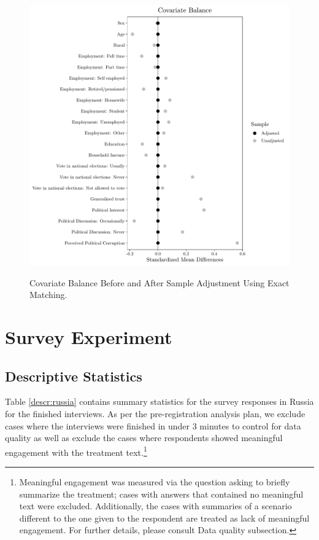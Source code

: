 \documentclass[11pt, ngerman,english,a4]{article}
\begin{document}
\begin{figure}[H]
    \caption{Covariate Balance Before and After Sample Adjustment Using Exact Matching.}
    \centering
    \includegraphics[width=0.9\linewidth]{covbalance_exact.pdf}
    \label{fig:balance}
\end{figure}

\newpage

\section{Survey Experiment} 
\subsection{Descriptive Statistics}

Table \ref{descr:russia} contains summary statistics for the survey responses in Russia for the finished interviews. As per the pre-registration analysis plan, we exclude cases where the interviews were finished in under 3 minutes to control for data quality as well as exclude the cases where respondents showed meaningful engagement with the treatment text.\footnote{Meaningful engagement was measured via the question asking to briefly summarize the treatment; cases with answers that contained no meaningful text were excluded. Additionally, the cases with summaries of a scenario different to the one given to the respondent are treated as lack of meaningful engagement. For further details, please consult Data quality subsection.}
\end{document}
